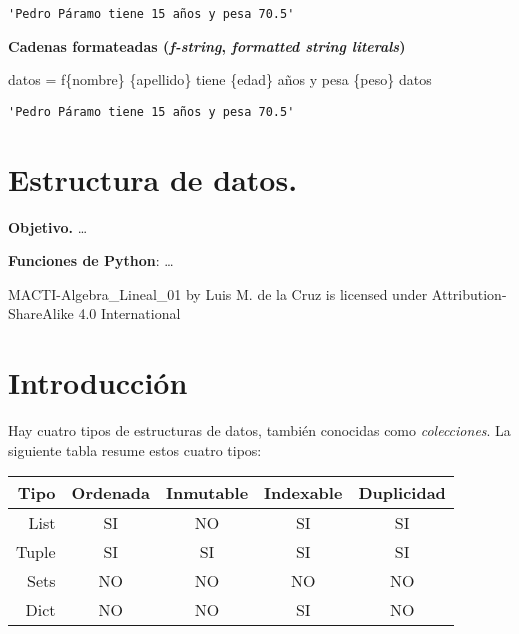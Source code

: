 \documentclass[
  letterpaper,
  DIV=11,
  numbers=noendperiod]{scrreprt}
\newenvironment{Shaded}{\begin{snugshade}}{\end{snugshade}}
\newcommand{\NormalTok}[1]{\textcolor[rgb]{0.00,0.23,0.31}{#1}}
\newcommand{\OperatorTok}[1]{\textcolor[rgb]{0.37,0.37,0.37}{#1}}
\newcommand{\SpecialCharTok}[1]{\textcolor[rgb]{0.37,0.37,0.37}{#1}}
\newcommand{\SpecialStringTok}[1]{\textcolor[rgb]{0.13,0.47,0.30}{#1}}
\begin{document}
\begin{verbatim}
'Pedro Páramo tiene 15 años y pesa 70.5'
\end{verbatim}

\textbf{Cadenas formateadas (\emph{f-string}, \emph{formatted string
literals})}

\begin{Shaded}
\begin{Highlighting}[]
\NormalTok{datos }\OperatorTok{=} \SpecialStringTok{f\textquotesingle{}}\SpecialCharTok{\{}\NormalTok{nombre}\SpecialCharTok{\}}\SpecialStringTok{ }\SpecialCharTok{\{}\NormalTok{apellido}\SpecialCharTok{\}}\SpecialStringTok{ tiene }\SpecialCharTok{\{}\NormalTok{edad}\SpecialCharTok{\}}\SpecialStringTok{ años y pesa }\SpecialCharTok{\{}\NormalTok{peso}\SpecialCharTok{\}}\SpecialStringTok{\textquotesingle{}}
\NormalTok{datos}
\end{Highlighting}
\end{Shaded}

\begin{verbatim}
'Pedro Páramo tiene 15 años y pesa 70.5'
\end{verbatim}


\chapter{Estructura de datos.}\label{estructura-de-datos.}

\textbf{Objetivo.} \ldots{}

\textbf{Funciones de Python}: \ldots{}

MACTI-Algebra\_Lineal\_01 by Luis M. de la Cruz is licensed under
Attribution-ShareAlike 4.0 International


\chapter{Introducción}\label{introducciuxf3n-1}

Hay cuatro tipos de estructuras de datos, también conocidas como
\emph{colecciones}. La siguiente tabla resume estos cuatro tipos:

\begin{longtable}[]{@{}rcccc@{}}
\toprule\noalign{}
Tipo & Ordenada & Inmutable & Indexable & Duplicidad \\
\midrule\noalign{}
\endhead
\bottomrule\noalign{}
\endlastfoot
List & SI & NO & SI & SI \\
Tuple & SI & SI & SI & SI \\
Sets & NO & NO & NO & NO \\
Dict & NO & NO & SI & NO \\
\end{longtable}
\end{document}
